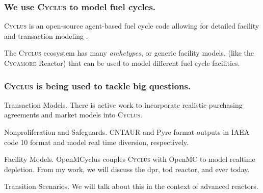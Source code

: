 \documentclass[9pt]{beamer}
\newcommand{\cycamore}{\textsc{Cycamore}\xspace}
\newcommand{\cyclus}{\textsc{Cyclus}\xspace}
\begin{document}
  \begin{frame}
    \frametitle{We use \cyclus to model fuel cycles.}
    \vspace{10pt}
    \cyclus is an open-source agent-based fuel cycle code allowing for detailed facility and transaction modeling \cite{huff_fundamental_2016}.
    \begin{center}
  \end{center} \pause

  The \cyclus ecosystem has many \textit{archetypes}, or generic facility models, (like the \cycamore Reactor) that can be used to model different fuel cycle facilities.
  \end{frame}

  \begin{frame}
    \frametitle{\cyclus is being used to tackle big questions.}
    \begin{block}{Transaction Models.}
        There is active work to incorporate realistic purchasing agreements and market models into \cyclus.
    \end{block} \pause
    \begin{block}{Nonproliferation and Safeguards.}
        CNTAUR \cite{mummah_advanced_2024} and Pyre \cite{westphal_modeling_2019} format outputs in IAEA code 10 format and model real time diversion, respectively.
    \end{block} \pause
    \begin{block}{Facility Models.}
      OpenMCyclus \cite{openmcyclus_paper} couples \cyclus with OpenMC to model realtime depletion. From my work, we will discuss the \gls{dpr}, \gls{tod} reactor, and \gls{ever} today.
  \end{block} \pause
    \begin{block}{Transition Scenarios.}
        We will talk about this in the context of advanced reactors.
    \end{block}
  \end{frame}
\end{document}
